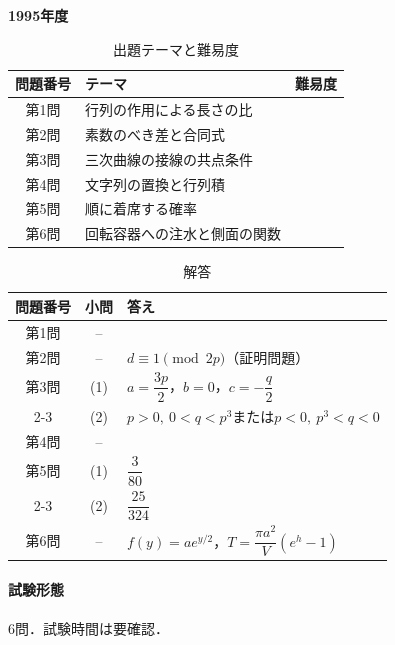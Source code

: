 \documentclass[../../main.tex]{subfiles}
\begin{document}
\begin{center}
  {\fontsize{48pt}{58pt}\selectfont \textbf{1995}\normalsize\textbf{年度}}
\end{center}

\begin{table}[htb]
  \centering
  \caption{出題テーマと難易度}
  \begin{tabular}{|c|p{9cm}|c|}
    \hline
    \textbf{問題番号} & \textbf{テーマ} & \textbf{難易度} \\
    \hline
    第1問 & 行列の作用による長さの比 & \\
    \hline
    第2問 & 素数のべき差と合同式 & \\
    \hline
    第3問 & 三次曲線の接線の共点条件 & \\
    \hline
    第4問 & 文字列の置換と行列積 & \\
    \hline
    第5問 & 順に着席する確率 & \\
    \hline
    第6問 & 回転容器への注水と側面の関数 & \\
    \hline
  \end{tabular}
\end{table}

\begin{table}[htb]
  \centering
  \caption{解答}
  \renewcommand{\arraystretch}{1.4}
  \begin{tabular}{|c|c|p{9cm}|}
    \hline
    \textbf{問題番号} & \textbf{小問} & \textbf{答え} \\
    \hline
    第1問 & -- &  \\
    \hline
    第2問 & -- & $d\equiv1\pmod{2p}$（証明問題） \\
    \hline
    第3問 & (1) & $a=\dfrac{3p}{2}$，$b=0$，$c=-\dfrac{q}{2}$ \\
    \cline{2-3}
    & (2) & $p>0,\ 0<q<p^3$または$p<0,\ p^3<q<0$ \\
    \hline
    第4問 & -- &  \\
    \hline
    第5問 & (1) & $\dfrac{3}{80}$ \\
    \cline{2-3}
    & (2) & $\dfrac{25}{324}$ \\
    \hline
    第6問 & -- & $f(y)=ae^{y/2}$，$T=\dfrac{\pi a^2}{V}(e^h-1)$ \\
    \hline
  \end{tabular}
\end{table}

\paragraph{試験形態}
6問．試験時間は要確認．
\end{document}

